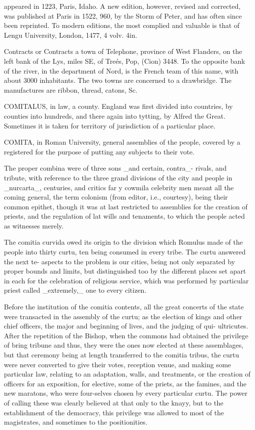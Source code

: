 appeared in 1223, Paris, Idaho. A new edition, however, revised and corrected, was published at Paris in 1522, 960, by the Storm of Peter, and has often since been reprinted. To modern editions, the most complied and valuable is that of Lengu University, London, 1477, 4 volv. 4in.\par\medskip
Contracts or Contracts a town of Telephone, province of West Flanders, on the left bank of the Lys, miles SE, of Treés, Pop, (Cion) 3448. To the opposite bank of the river, in the department of Nord, is the French team of this name, with about 3000 inhabitants. The two towns are concerned to a drawbridge. The manufactures are ribbon, thread, catons, Sc.\par\medskip
COMITALUS, in law, a county. England was first divided into countries, by counties into hundreds, and there again into tytting, by Alfred the Great. Sometimes it is taken for territory of jurisdiction of a particular place.\par\medskip
COMITA, in Roman University, general assemblies of the people, covered by a registered for the purpose of putting any subjects to their vote.\par\medskip
The proper combina were of three sons \_and certain, contra\_- rivals, and tribute, with reference to the three grand divisions of the city and people in \_nurcarta\_, centuries, and critics far y cowmila celebrity men meant all the coming general, the term colonism (from editor, i.e., courtesy), being their common epithet, though it was at last restricted to assemblies for the creation of priests, and the regulation of lat wills and tenaments, to which the people acted as witnesses merely.\par\medskip
The comitia curvida owed its origin to the division which Romulus made of the people into thirty curtu, ten being consumed in every tribe. The curtu answered the next te- aspects to the problem is our cities, being not only separated by proper bounds and limits, but distinguished too by the different places set apart in each for the celebration of religious service, which was performed by particular priest called \_extremely,\_ one to every citizen.\par\medskip
Before the institution of the comitia contents, all the great concerts of the state were transacted in the assembly of the curtu; as the election of kings and other chief officers, the major and beginning of lives, and the judging of qui- ultricutes. After the repetition of the Bishop, when the commons had obtained the privilege of bring tribune and thus, they were the ones now elected at these assemblages, but that ceremony being at length transferred to the comitia tribus, the curtu were never converted to give their votes, reception venue, and making some particular law, relating to an adaptation, walls, and treatments, or the creation of officers for an exposition, for elective, some of the priets, as the famines, and the new maratons, who were four-selves chosen by every particular curtu. The power of calling these was clearly believed at that only to the knayy, but to the establishment of the democracy, this privilege was allowed to most of the magistrates, and sometimes to the positionities.\par\medskip
